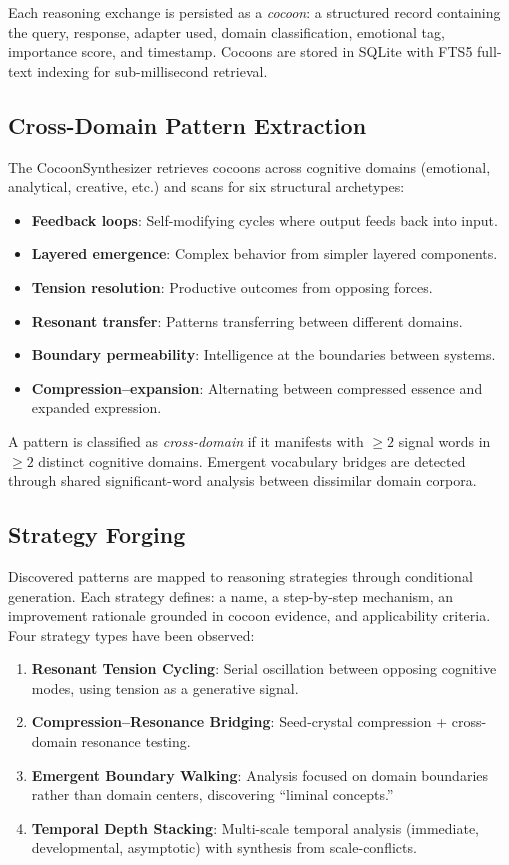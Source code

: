 \documentclass[11pt,a4paper]{article}
\begin{document}
Each reasoning exchange is persisted as a \emph{cocoon}: a structured record containing the query, response, adapter used, domain classification, emotional tag, importance score, and timestamp. Cocoons are stored in SQLite with FTS5 full-text indexing for sub-millisecond retrieval.

\subsection{Cross-Domain Pattern Extraction}

The CocoonSynthesizer retrieves cocoons across cognitive domains (emotional, analytical, creative, etc.) and scans for six structural archetypes:

\begin{itemize}[nosep]
  \item \textbf{Feedback loops}: Self-modifying cycles where output feeds back into input.
  \item \textbf{Layered emergence}: Complex behavior from simpler layered components.
  \item \textbf{Tension resolution}: Productive outcomes from opposing forces.
  \item \textbf{Resonant transfer}: Patterns transferring between different domains.
  \item \textbf{Boundary permeability}: Intelligence at the boundaries between systems.
  \item \textbf{Compression--expansion}: Alternating between compressed essence and expanded expression.
\end{itemize}

A pattern is classified as \emph{cross-domain} if it manifests with $\geq 2$ signal words in $\geq 2$ distinct cognitive domains. Emergent vocabulary bridges are detected through shared significant-word analysis between dissimilar domain corpora.

\subsection{Strategy Forging}

Discovered patterns are mapped to reasoning strategies through conditional generation. Each strategy defines: a name, a step-by-step mechanism, an improvement rationale grounded in cocoon evidence, and applicability criteria. Four strategy types have been observed:

\begin{enumerate}[nosep]
  \item \textbf{Resonant Tension Cycling}: Serial oscillation between opposing cognitive modes, using tension as a generative signal.
  \item \textbf{Compression--Resonance Bridging}: Seed-crystal compression + cross-domain resonance testing.
  \item \textbf{Emergent Boundary Walking}: Analysis focused on domain boundaries rather than domain centers, discovering ``liminal concepts.''
  \item \textbf{Temporal Depth Stacking}: Multi-scale temporal analysis (immediate, developmental, asymptotic) with synthesis from scale-conflicts.
\end{enumerate}
\end{document}
